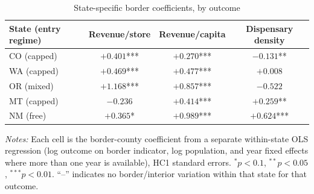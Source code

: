 \begin{table}[htbp]
\centering
\caption{State-specific border coefficients, by outcome}
\label{tab:state_specific}
\begin{tabular}{lccc}
\toprule
State (entry regime) & Revenue/store & Revenue/capita & Dispensary density \\
\midrule
CO (capped) & $+0.401$*** & $+0.270$*** & $-0.131$** \\
WA (capped) & $+0.469$*** & $+0.477$*** & $+0.008$ \\
OR (mixed) & $+1.168$*** & $+0.857$*** & $-0.522$ \\
MT (capped) & $-0.236$ & $+0.414$*** & $+0.259$** \\
NM (free) & $+0.365$* & $+0.989$*** & $+0.624$*** \\
\bottomrule
\end{tabular}
\begin{minipage}{0.85\textwidth}
\vspace{0.3em}
\footnotesize
\textit{Notes:} Each cell is the border-county coefficient from a separate within-state OLS regression
(log outcome on border indicator, log population, and year fixed effects where more than one year is
available), HC1 standard errors. $^{*}p<0.1$, $^{**}p<0.05$, $^{***}p<0.01$. ``--'' indicates no
border/interior variation within that state for that outcome.
\end{minipage}
\end{table}
